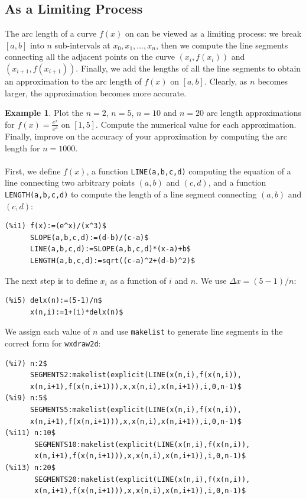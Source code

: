 \documentclass[10.5pt,twoside]{report}
\theoremstyle{definition}
\newtheorem{exmp}{Example}[section]
\begin{document}
\subsection{As a Limiting Process}

The arc length of a curve $f(x)$ on can be viewed as a limiting process:  we break $[a,b]$ into $n$ sub-intervals at $x_0,x_1,...,x_n$, then we compute the line segments connecting all the adjacent points on the curve $(x_{i},f(x_{i}))$ and $(x_{i+1},f(x_{i+1}))$.  Finally, we add the lengths of all the line segments to obtain an approximation to the arc length of $f(x)$ on $[a,b]$.  Clearly, as $n$ becomes larger, the approximation becomes more accurate.

\begin{exmp} Plot the $n=2$, $n=5$, $n=10$ and $n=20$ arc length approximations for $f(x)=\displaystyle \frac{e^{x}}{x^3}$ on $[1,5]$.  Compute the numerical value for each approximation.  Finally, improve on the accuracy of your approximation by computing the arc length for $n=1000$.\\
${}$\\
First, we define $f(x)$, a function \verb|LINE(a,b,c,d)| computing the equation of a line connecting two arbitrary points $(a,b)$ and $(c,d)$, and a function \verb|LENGTH(a,b,c,d)| to compute the length of a line segment connecting $(a,b)$ and $(c,d)$:\\

\begin{verbatim}
(%i1) f(x):=(e^x)/(x^3)$
      SLOPE(a,b,c,d):=(d-b)/(c-a)$
      LINE(a,b,c,d):=SLOPE(a,b,c,d)*(x-a)+b$
      LENGTH(a,b,c,d):=sqrt((c-a)^2+(d-b)^2)$
\end{verbatim}

The next step is to define $x_i$ as a function of $i$ and $n$.  We use $\Delta x=(5-1)/n$:

\begin{verbatim}
(%i5) delx(n):=(5-1)/n$
      x(n,i):=1+(i)*delx(n)$
\end{verbatim}

We assign each value of $n$ and use \verb|makelist| to generate line segments in the correct form for \verb|wxdraw2d|:

\begin{verbatim}
(%i7) n:2$
      SEGMENTS2:makelist(explicit(LINE(x(n,i),f(x(n,i)),
      x(n,i+1),f(x(n,i+1))),x,x(n,i),x(n,i+1)),i,0,n-1)$
(%i9) n:5$
      SEGMENTS5:makelist(explicit(LINE(x(n,i),f(x(n,i)),
      x(n,i+1),f(x(n,i+1))),x,x(n,i),x(n,i+1)),i,0,n-1)$
(%i11) n:10$
       SEGMENTS10:makelist(explicit(LINE(x(n,i),f(x(n,i)),
       x(n,i+1),f(x(n,i+1))),x,x(n,i),x(n,i+1)),i,0,n-1)$
(%i13) n:20$
       SEGMENTS20:makelist(explicit(LINE(x(n,i),f(x(n,i)),
       x(n,i+1),f(x(n,i+1))),x,x(n,i),x(n,i+1)),i,0,n-1)$
\end{verbatim}


\end{exmp}
\end{document}
